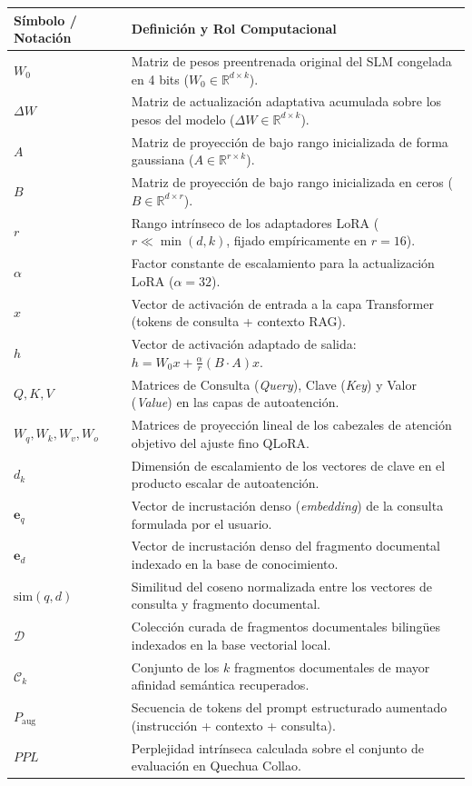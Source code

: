 \begin{table}[H]
\centering
\small
\begin{tabularx}{\textwidth}{@{}p{3.2cm}X@{}}
\toprule
\rowcolor{tcAzul!12}
\textbf{Símbolo / Notación} & \textbf{Definición y Rol Computacional} \\
\midrule
$W_0$ & Matriz de pesos preentrenada original del SLM congelada en 4 bits ($W_0 \in \mathbb{R}^{d \times k}$). \\
$\Delta W$ & Matriz de actualización adaptativa acumulada sobre los pesos del modelo ($\Delta W \in \mathbb{R}^{d \times k}$). \\
$A$ & Matriz de proyección de bajo rango inicializada de forma gaussiana ($A \in \mathbb{R}^{r \times k}$). \\
$B$ & Matriz de proyección de bajo rango inicializada en ceros ($B \in \mathbb{R}^{d \times r}$). \\
$r$ & Rango intrínseco de los adaptadores LoRA ($r \ll \min(d, k)$, fijado empíricamente en $r=16$). \\
$\alpha$ & Factor constante de escalamiento para la actualización LoRA ($\alpha = 32$). \\
$x$ & Vector de activación de entrada a la capa Transformer (tokens de consulta + contexto RAG). \\
$h$ & Vector de activación adaptado de salida: $h = W_0 x + \frac{\alpha}{r} (B \cdot A) x$. \\
$Q, K, V$ & Matrices de Consulta (\textit{Query}), Clave (\textit{Key}) y Valor (\textit{Value}) en las capas de autoatención. \\
$W_q, W_k, W_v, W_o$ & Matrices de proyección lineal de los cabezales de atención objetivo del ajuste fino QLoRA. \\
$d_k$ & Dimensión de escalamiento de los vectores de clave en el producto escalar de autoatención. \\
$\mathbf{e}_q$ & Vector de incrustación denso (\textit{embedding}) de la consulta formulada por el usuario. \\
$\mathbf{e}_d$ & Vector de incrustación denso del fragmento documental indexado en la base de conocimiento. \\
$\text{sim}(q, d)$ & Similitud del coseno normalizada entre los vectores de consulta y fragmento documental. \\
$\mathcal{D}$ & Colección curada de fragmentos documentales bilingües indexados en la base vectorial local. \\
$\mathcal{C}_k$ & Conjunto de los $k$ fragmentos documentales de mayor afinidad semántica recuperados. \\
$P_{\text{aug}}$ & Secuencia de tokens del prompt estructurado aumentado (instrucción + contexto + consulta). \\
$PPL$ & Perplejidad intrínseca calculada sobre el conjunto de evaluación en Quechua Collao. \\
\bottomrule
\end{tabularx}
\end{table}


